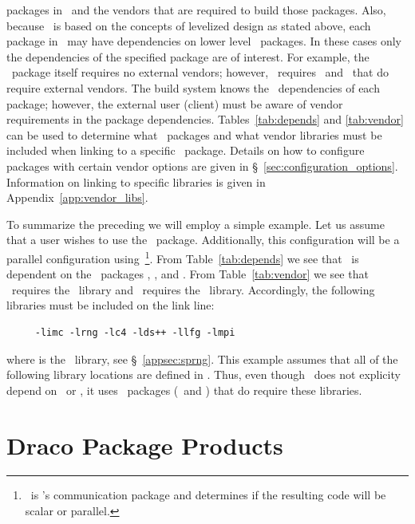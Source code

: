 packages in \draco\ and the vendors that are required to build those
packages.  Also, because \draco\ is based on the concepts of levelized
design as stated above, each package in \draco\ may have dependencies
on lower level \draco\ packages.  In these cases only the dependencies
of the specified package are of interest.  For example, the \imc\ 
package itself requires no external vendors; however, \imc\ requires
\cfour\ and \rng\ that do require external vendors.  The build system
knows the \draco\ dependencies of each package; however, the external
user (client) must be aware of vendor requirements in the package
dependencies.  Tables~\ref{tab:depends} and \ref{tab:vendor} can be
used to determine what \draco\ packages and what vendor libraries must
be included when linking to a specific \draco\ package.  Details on
how to configure packages with certain vendor options are given in
\S~\ref{sec:configuration_options}.  Information on linking to
specific libraries is given in Appendix~\ref{app:vendor_libs}.

To summarize the preceding we will employ a simple example.  Let us
assume that a user wishes to use the \imc\ package.  Additionally,
this configuration will be a parallel configuration using
\mpi\,\footnote{\cfour\ is \draco's communication package and
  determines if the resulting code will be scalar or parallel.}.  From
Table~\ref{tab:depends} we see that \imc\ is dependent on the \draco\ 
packages \dsxx, \rng, and \cfour.  From Table~\ref{tab:vendor} we see
that \rng\ requires the \sprng\ library and \cfour\ requires the \mpi\ 
library.  Accordingly, the following libraries must be included on the
link line:
\begin{verbatim}
     -limc -lrng -lc4 -lds++ -llfg -lmpi
\end{verbatim}
where  is the \sprng\ library, see \S~\ref{appsec:sprng}.
This example assumes that all of the following library locations are
defined in \ldlib.  Thus, even though \imc\ does not explicity depend
on \mpi\ or \sprng, it uses \draco\ packages (\cfour\ and \rng) that
do require these libraries.


\section{Draco Package Products}

